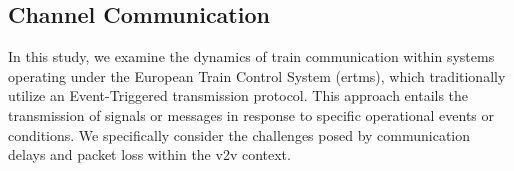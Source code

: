 \begin{comment}
	
	However, during the \textit{L3}$\rightarrow$\textit{VC} state, if the two trains establish a $\text{V2V}_{\text{\mathrm{L}}}$ communication, the state machine proceeds to the \textit{VC} state. Here, a robust switched \gls{nmpc} controllers $K_{\tau_1}, K_{\tau_2}$ and $K_{\tau_3}$, based on safety barrier functions detailed in section \ref{subsec:robustMPC}, are employed to manage this operational state. In the event of an emergency detected by the trains themselves, $\text{PLA}_{\text{C}}$ which will be defined in Section \ref{subsec:EventCollisionDetector}, or $\text{V2V}_{\text{\mathrm{L}}}$ communication is lost, or \gls{rbc} stops the virtual coupling operation state, in all these case the follower train equipped with an emergency controller $K_E$, will be utilized to transition the trains back to the \textit{L3} state.
	
	During the \textit{L3}$\leftarrow$\textit{VC} state, the controller steers the follower's position to a $S_{L3}$ distance relative to the leader. Upon reaching this point, both trains will revert to the \textit{L3} operational state. This process is pivotal in ensuring a smooth and safe transition from the virtual coupling mode to the standard Level 3 operation, maintaining a secure separation distance between the two trains as required by the existing protocol.
	
	The entire process is structured as a state machine wich have $4$ state: \gls{l3}, \gls{l3vc}, \gls{l3vc} and \gls{vcl3}. For the sake of simplicity we suppose to start from state \gls{l3}, here the two trains are travelling with a distance $d_{L3}$ and communicate to the infrastructure their availability to perform a \gls{vc}. Is an \gls{rbc} decision to create a \gls{vc}, this is obvious because only the infrastructure has a highest point of view on the railway traffic respect to the trains. Once that the \gls{rbc} decide for a \gls{vc} operation and computed the corresponding trajectories for the trains and sent by \gls{ma} the state arrive in \gls{l3vc}.
\end{comment}
%
\subsection{Channel Communication}
\label{subsec:transmissionEvent}
%
%
In this study, we examine the dynamics of train communication within systems operating under the European Train Control System (\gls{ertms}), which traditionally utilize an Event-Triggered transmission protocol. This approach entails the transmission of signals or messages in response to specific operational events or conditions. We specifically consider the challenges posed by communication delays and packet loss within the \gls{v2v} context.

